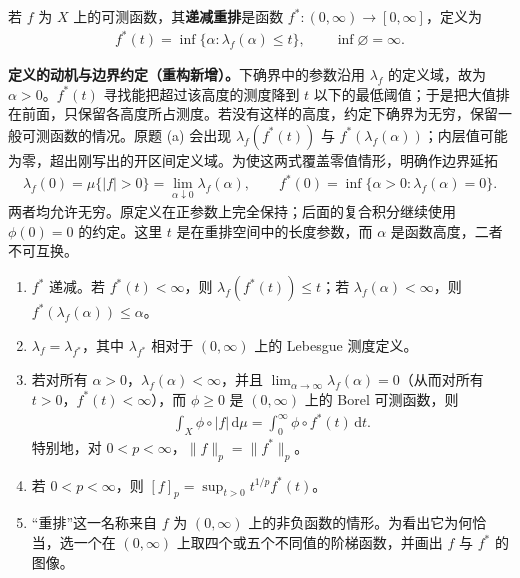 \documentclass[../../main.tex]{subfiles}
\begin{document}
\begin{exercise}\label{exercise:ch06-decreasing-rearrangement}
\begin{definition*}[递减重排]\label{definition:ch06-decreasing-rearrangement}
若 $f$ 为 $X$ 上的可测函数，其\textbf{递减重排}是函数 $f^*:(0,\infty)\to[0,\infty]$，定义为
\begin{align*}
f^*(t)=\inf\{\alpha:\lambda_f(\alpha)\leqslant t\},\qquad\inf\varnothing=\infty.
\end{align*}
\end{definition*}
\begin{remark}
\textbf{定义的动机与边界约定（重构新增）。}下确界中的参数沿用 $\lambda_f$ 的定义域，故为 $\alpha>0$。$f^*(t)$ 寻找能把超过该高度的测度降到 $t$ 以下的最低阈值；于是把大值排在前面，只保留各高度所占测度。若没有这样的高度，约定下确界为无穷，保留一般可测函数的情况。原题 (a) 会出现 $\lambda_f(f^*(t))$ 与 $f^*(\lambda_f(\alpha))$；内层值可能为零，超出刚写出的开区间定义域。为使这两式覆盖零值情形，明确作边界延拓
\begin{align*}
\lambda_f(0)=\mu\{|f|>0\}=\lim_{\alpha\downarrow0}\lambda_f(\alpha),
\qquad f^*(0)=\inf\{\alpha>0:\lambda_f(\alpha)=0\}.
\end{align*}
两者均允许无穷。原定义在正参数上完全保持；后面的复合积分继续使用 $\phi(0)=0$ 的约定。这里 $t$ 是在重排空间中的长度参数，而 $\alpha$ 是函数高度，二者不可互换。
\end{remark}
\begin{enumerate}
\item\label{item:ch06-rearrangement-inverse} $f^*$ 递减。若 $f^*(t)<\infty$，则 $\lambda_f(f^*(t))\leqslant t$；若 $\lambda_f(\alpha)<\infty$，则 $f^*(\lambda_f(\alpha))\leqslant\alpha$。
\item\label{item:ch06-rearrangement-equimeasurable} $\lambda_f=\lambda_{f^*}$，其中 $\lambda_{f^*}$ 相对于 $(0,\infty)$ 上的 Lebesgue 测度定义。
\item\label{item:ch06-rearrangement-integrals} 若对所有 $\alpha>0$，$\lambda_f(\alpha)<\infty$，并且 $\lim_{\alpha\to\infty}\lambda_f(\alpha)=0$（从而对所有 $t>0$，$f^*(t)<\infty$），而 $\phi\geqslant0$ 是 $(0,\infty)$ 上的 Borel 可测函数，则
\begin{align*}
\int_X\phi\circ|f|\,\mathrm d\mu=\int_0^\infty\phi\circ f^*(t)\,\mathrm dt.
\end{align*}
特别地，对 $0<p<\infty$，$\|f\|_p=\|f^*\|_p$。
\item\label{item:ch06-rearrangement-weak-norm} 若 $0<p<\infty$，则 $[f]_p=\sup_{t>0}t^{1/p}f^*(t)$。
\item\label{item:ch06-rearrangement-graph} “重排”这一名称来自 $f$ 为 $(0,\infty)$ 上的非负函数的情形。为看出它为何恰当，选一个在 $(0,\infty)$ 上取四个或五个不同值的阶梯函数，并画出 $f$ 与 $f^*$ 的图像。
\end{enumerate}
\end{exercise}
\end{document}
